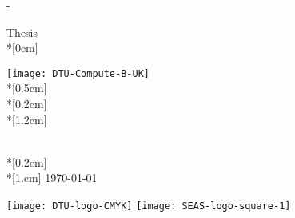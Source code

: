 \thispagestyle{empty}             %
\calccentering{\unitlength}
\begin{adjustwidth*}{\unitlength}{-\unitlength}
    \begin{adjustwidth}{-0.5cm}{-0.5cm}
        \sffamily
        \begin{flushright}
            \thesistypeabbr{} Thesis\\*[0cm]
            \thesistype{}\\
        \end{flushright}
        \vspace*{\fill}
        \noindent
        \texttt{[image: DTU-Compute-B-UK]}\\*[0.5cm]
        \HUGE \thesistitle{}\\*[0.2cm]
        \Huge \thesissubtitle{}\\*[1.2cm]
        \parbox[b]{0.5\linewidth}{%
            \LARGE 
            \thesisauthor{}\\*[0.2cm]
            \thesisadvisors{} \\*[1.cm]
            \Large 
            \thesislocation{} \today
        }
        \hfill\texttt{[image: DTU-logo-CMYK]}
        \hspace{0.01mm}
        \texttt{[image: SEAS-logo-square-1]}
    \end{adjustwidth}
\end{adjustwidth*}
\normalfont
\normalsize

